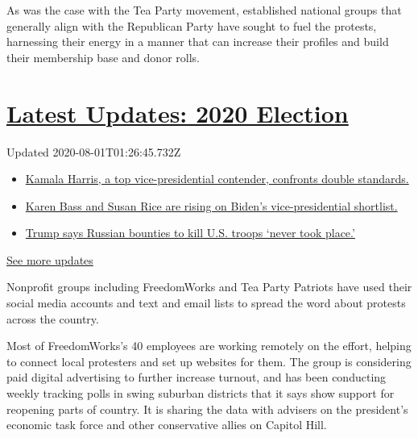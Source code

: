As was the case with the Tea Party movement, established national groups
that generally align with the Republican Party have sought to fuel the
protests, harnessing their energy in a manner that can increase their
profiles and build their membership base and donor rolls.

\hypertarget{latest-updates-2020-election}{%
\section{\texorpdfstring{\href{https://www.nytimes3xbfgragh.onion/2020/07/31/us/elections/biden-vs-trump.html?action=click\&pgtype=Article\&state=default\&region=MAIN_CONTENT_1\&context=storylines_live_updates}{Latest
Updates: 2020
Election}}{Latest Updates: 2020 Election}}\label{latest-updates-2020-election}}

Updated 2020-08-01T01:26:45.732Z

\begin{itemize}
\tightlist
\item
  \href{https://www.nytimes3xbfgragh.onion/2020/07/31/us/elections/biden-vs-trump.html?action=click\&pgtype=Article\&state=default\&region=MAIN_CONTENT_1\&context=storylines_live_updates\#link-29fdff45}{Kamala
  Harris, a top vice-presidential contender, confronts double
  standards.}
\item
  \href{https://www.nytimes3xbfgragh.onion/2020/07/31/us/elections/biden-vs-trump.html?action=click\&pgtype=Article\&state=default\&region=MAIN_CONTENT_1\&context=storylines_live_updates\#link-13ec3d9c}{Karen
  Bass and Susan Rice are rising on Biden's vice-presidential
  shortlist.}
\item
  \href{https://www.nytimes3xbfgragh.onion/2020/07/31/us/elections/biden-vs-trump.html?action=click\&pgtype=Article\&state=default\&region=MAIN_CONTENT_1\&context=storylines_live_updates\#link-49e9a016}{Trump
  says Russian bounties to kill U.S. troops `never took place.'}
\end{itemize}

\href{https://www.nytimes3xbfgragh.onion/2020/07/31/us/elections/biden-vs-trump.html?action=click\&pgtype=Article\&state=default\&region=MAIN_CONTENT_1\&context=storylines_live_updates}{See
more updates}

Nonprofit groups including FreedomWorks and Tea Party Patriots have used
their social media accounts and text and email lists to spread the word
about protests across the country.

Most of FreedomWorks's 40 employees are working remotely on the effort,
helping to connect local protesters and set up websites for them. The
group is considering paid digital advertising to further increase
turnout, and has been conducting weekly tracking polls in swing suburban
districts that it says show support for reopening parts of country. It
is sharing the data with advisers on the president's economic task force
and other conservative allies on Capitol Hill.

